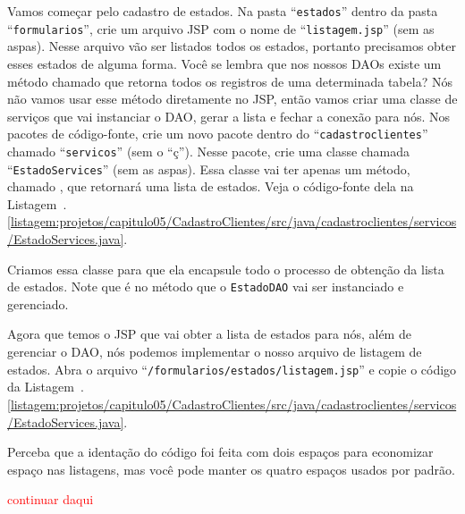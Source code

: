 Vamos começar pelo cadastro de estados. Na pasta ``\texttt{estados}'' dentro da pasta\linebreak%
``\texttt{formularios}'', crie um arquivo JSP com o nome de ``\texttt{listagem.jsp}'' (sem as aspas). Nesse arquivo vão ser listados todos os estados, portanto precisamos obter esses estados de alguma forma. Você se lembra que nos nossos DAOs existe um método chamado  que retorna todos os registros de uma determinada tabela? Nós não vamos usar esse método diretamente no JSP, então vamos criar uma classe de serviços que vai instanciar o DAO, gerar a lista e fechar a conexão para nós. Nos pacotes de código-fonte, crie um novo pacote dentro do ``\texttt{cadastroclientes}'' chamado ``\texttt{servicos}'' (sem o ``ç''). Nesse pacote, crie uma classe chamada ``\texttt{EstadoServices}'' (sem as aspas). Essa classe vai ter apenas um método, chamado , que retornará uma lista de estados. Veja o código-fonte dela na Listagem~\thechapter.\ref{listagem:projetos/capitulo05/CadastroClientes/src/java/cadastroclientes/servicos/EstadoServices.java}.


Criamos essa classe para que ela encapsule todo o processo de obtenção da lista de estados. Note que é no método  que o \texttt{EstadoDAO} vai ser instanciado e gerenciado.

Agora que temos o JSP que vai obter a lista de estados para nós, além de gerenciar o DAO, nós podemos implementar o nosso arquivo de listagem de estados. Abra o arquivo ``\texttt{/formularios/estados/listagem.jsp}'' e copie o código da Listagem~\thechapter.\ref{listagem:projetos/capitulo05/CadastroClientes/src/java/cadastroclientes/servicos/EstadoServices.java}.


Perceba que a identação do código foi feita com dois espaços para economizar espaço nas listagens, mas você pode manter os quatro espaços usados por padrão.

\textcolor{red}{continuar daqui}

